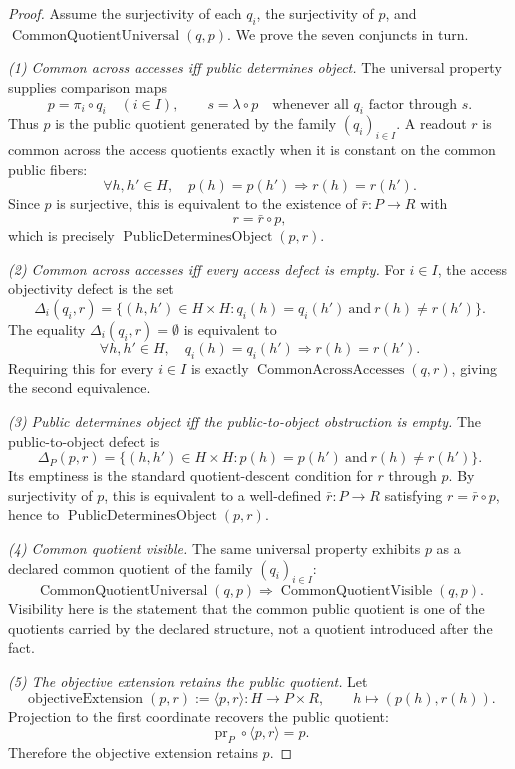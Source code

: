 \documentclass[11pt]{article}
\theoremstyle{definition}
\begin{document}
\begin{proof}
Assume the surjectivity of each \(q_i\), the surjectivity of \(p\),
and \(\operatorname{CommonQuotientUniversal}(q,p)\).  We prove the
seven conjuncts in turn.

\emph{(1) Common across accesses iff public determines object.}
The universal property supplies comparison maps
\[
  p=\pi_i\circ q_i\quad(i\in I),
  \qquad
  s=\lambda\circ p
  \quad\text{whenever all }q_i\text{ factor through }s .
\]
Thus \(p\) is the public quotient generated by the family
\((q_i)_{i\in I}\).  A readout \(r\) is common across the access
quotients exactly when it is constant on the common public fibers:
\[
  \forall h,h'\in H,\quad
  p(h)=p(h')\Longrightarrow r(h)=r(h').
\]
Since \(p\) is surjective, this is equivalent to the existence of
\(\bar r:P\to R\) with
\[
  r=\bar r\circ p,
\]
which is precisely \(\operatorname{PublicDeterminesObject}(p,r)\).

\emph{(2) Common across accesses iff every access defect is empty.}
For \(i\in I\), the access objectivity defect is the set
\[
  \Delta_i(q_i,r)
  =
  \{(h,h')\in H\times H:
      q_i(h)=q_i(h')\ \text{and}\ r(h)\neq r(h')\}.
\]
The equality \(\Delta_i(q_i,r)=\emptyset\) is equivalent to
\[
  \forall h,h'\in H,\quad
  q_i(h)=q_i(h')\Longrightarrow r(h)=r(h').
\]
Requiring this for every \(i\in I\) is exactly
\(\operatorname{CommonAcrossAccesses}(q,r)\), giving the second
equivalence.

\emph{(3) Public determines object iff the public-to-object
obstruction is empty.}
The public-to-object defect is
\[
  \Delta_P(p,r)
  =
  \{(h,h')\in H\times H:
      p(h)=p(h')\ \text{and}\ r(h)\neq r(h')\}.
\]
Its emptiness is the standard quotient-descent condition for \(r\)
through \(p\).  By surjectivity of \(p\), this is equivalent to a
well-defined \(\bar r:P\to R\) satisfying \(r=\bar r\circ p\), hence
to \(\operatorname{PublicDeterminesObject}(p,r)\).

\emph{(4) Common quotient visible.}
The same universal property exhibits \(p\) as a declared common
quotient of the family \((q_i)_{i\in I}\):
\[
  \operatorname{CommonQuotientUniversal}(q,p)
  \Longrightarrow
  \operatorname{CommonQuotientVisible}(q,p).
\]
Visibility here is the statement that the common public quotient is
one of the quotients carried by the declared structure, not a quotient
introduced after the fact.

\emph{(5) The objective extension retains the public quotient.}
Let
\[
  \operatorname{objectiveExtension}(p,r)
  :=
  \langle p,r\rangle:H\longrightarrow P\times R,
  \qquad
  h\longmapsto (p(h),r(h)).
\]
Projection to the first coordinate recovers the public quotient:
\[
  \operatorname{pr}_P\circ\langle p,r\rangle=p.
\]
Therefore the objective extension retains \(p\).


\end{proof}
\end{document}
